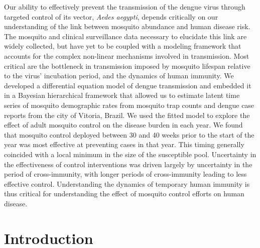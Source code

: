 \documentclass[10pt,letterpaper]{article}
\begin{document}
Our ability to effectively prevent the transmission of the dengue virus through targeted control of its vector, \emph{Aedes aegypti}, depends critically on our understanding of the link between mosquito abundance and human disease risk.
The mosquito and clinical surveillance data necessary to elucidate this link are widely collected, but have yet to be coupled with a modeling framework that accounts for the complex non-linear mechanisms involved in transmission.
Most critical are the bottleneck in transmission imposed by mosquito lifespan relative to the virus' incubation period, and the dynamics of human immunity.
We developed a differential equation model of dengue transmission and embedded it in a Bayesian hierarchical framework that allowed us to estimate latent time series of mosquito demographic rates from mosquito trap counts and dengue case reports from the city of Vitoria, Brazil.
We used the fitted model to explore the effect of adult mosquito control on the disease burden in each year.
We found that mosquito control deployed between 30 and 40 weeks prior to the start of the year was most effective at preventing cases in that year. 
This timing generally coincided with a local minimum in the size of the susceptible pool.
Uncertainty in the effectiveness of control interventions was driven largely by uncertainty in the period of cross-immunity, with longer periods of cross-immunity leading to less effective control.
Understanding the dynamics of temporary human immunity is thus critical for understanding the effect of mosquito control efforts on human disease.


\linenumbers


\section*{Introduction}
\end{document}
